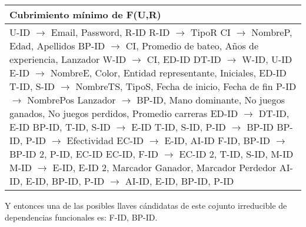 \documentclass{report}
\begin{document}
    \begin{tabularx}{\textwidth}{|X|}
        \toprule
        \hfil \textbf{Cubrimiento mínimo de F(U,R)} \\
        \midrule
        U-ID $\rightarrow$ Email, Password, R-ID \newline 
        R-ID $\rightarrow$ TipoR \newline 
        CI $\rightarrow$ NombreP, Edad, Apellidos \newline 
        BP-ID $\rightarrow$ CI, Promedio de bateo, Años de experiencia, Lanzador \newline 
        W-ID $\rightarrow$ CI, ED-ID \newline 
        DT-ID $\rightarrow$ W-ID, U-ID \newline 
        E-ID $\rightarrow$ NombreE, Color, Entidad representante, Iniciales, ED-ID \newline 
        T-ID, S-ID $\rightarrow$ NombreTS, TipoS, Fecha de inicio, Fecha de fin \newline 
        P-ID $\rightarrow$ NombrePos \newline 
        Lanzador $\rightarrow$ BP-ID, Mano dominante, No juegos ganados, No juegos perdidos, Promedio carreras \newline 
        ED-ID $\rightarrow$ DT-ID, E-ID \newline 
        BP-ID, T-ID, S-ID $\rightarrow$ E-ID \newline 
        T-ID, S-ID, P-ID $\rightarrow$ BP-ID \newline 
        BP-ID, P-ID $\rightarrow$ Efectividad \newline 
        EC-ID $\rightarrow$ E-ID, AI-ID \newline 
        F-ID, BP-ID $\rightarrow$ BP-ID 2, P-ID, EC-ID \newline 
        EC-ID, F-ID $\rightarrow$ EC-ID 2, T-ID, S-ID, M-ID \newline 
        M-ID $\rightarrow$ E-ID, E-ID 2, Marcador Ganador, Marcador Perdedor \newline 
        AI-ID, E-ID, BP-ID, P-ID $\rightarrow$ AI-ID, E-ID, BP-ID, P-ID \newline \\ 
        \bottomrule
    \end{tabularx}

    \newpage 

    Y entonces una de las posibles llaves cándidatas de este cojunto irreducible de dependencias funcionales es: F-ID, BP-ID. \newline
\end{document}
